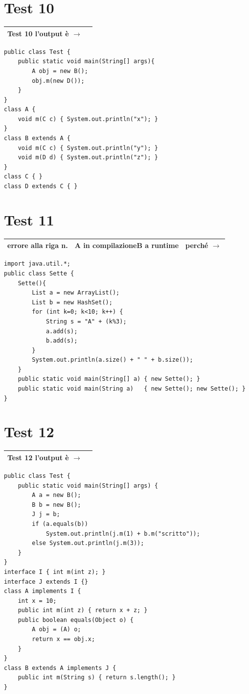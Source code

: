 \documentclass[a4paper,12pt]{article}
\newcommand{\errorbox}{%
  \vspace{0.4em}
  \noindent
  \begin{tabular}{|p{3.2cm}|p{3.4cm}|p{5.6cm}|}
    \hline
    \rule{0pt}{2.4em}errore alla riga n.\dotfill\dotfill &
    \textbf{A} in compilazione\newline\textbf{B} a runtime &
    perché $\rightarrow$ \\[1.6em]
    \hline
  \end{tabular}
  \vspace{0.4em}
}
\newcommand{\outputbox}[1]{%
  \vspace{0.4em}
  \noindent
  \begin{tabular}{|l|p{10cm}|}
    \hline
    \rule{0pt}{1.8em}\textbf{#1} \quad l'output è $\rightarrow$ & \phantom{XXXXXXXXXXXXXXXXXXX} \\
    \hline
  \end{tabular}
  \vspace{0.4em}
}
\begin{document}
\section*{Test 10}
\outputbox{Test 10}
 
\begin{lstlisting}[style=java]
public class Test {
    public static void main(String[] args){
        A obj = new B();
        obj.m(new D());
    }
}
class A {
    void m(C c) { System.out.println("x"); }
}
class B extends A {
    void m(C c) { System.out.println("y"); }
    void m(D d) { System.out.println("z"); }
}
class C { }
class D extends C { }
\end{lstlisting}
 
\section*{Test 11}
\errorbox
 
\begin{lstlisting}[style=java]
import java.util.*;
public class Sette {
    Sette(){
        List a = new ArrayList();
        List b = new HashSet();
        for (int k=0; k<10; k++) {
            String s = "A" + (k%3);
            a.add(s);
            b.add(s);
        }
        System.out.println(a.size() + " " + b.size());
    }
    public static void main(String[] a) { new Sette(); }
    public static void main(String a)   { new Sette(); new Sette(); }
}
\end{lstlisting}
 
\section*{Test 12}
\outputbox{Test 12}
 
\begin{lstlisting}[style=java]
public class Test {
    public static void main(String[] args) {
        A a = new B();
        B b = new B();
        J j = b;
        if (a.equals(b))
            System.out.println(j.m(1) + b.m("scritto"));
        else System.out.println(j.m(3));
    }
}
interface I { int m(int z); }
interface J extends I {}
class A implements I {
    int x = 10;
    public int m(int z) { return x + z; }
    public boolean equals(Object o) {
        A obj = (A) o;
        return x == obj.x;
    }
}
class B extends A implements J {
    public int m(String s) { return s.length(); }
}
\end{lstlisting}
 
\end{document}
